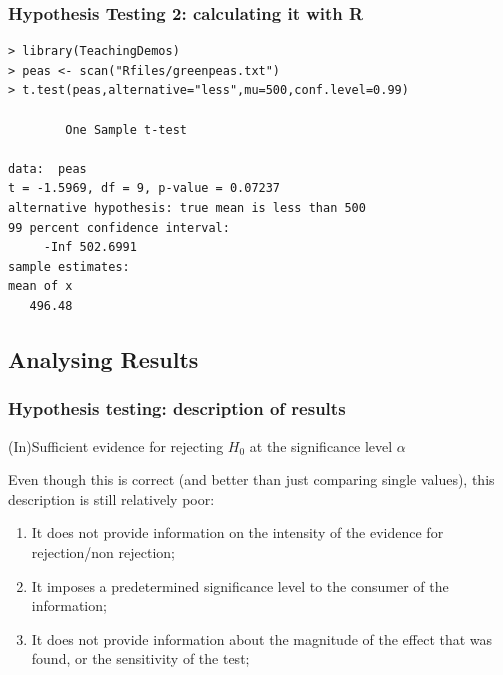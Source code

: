 \documentclass[10pt]{beamer}
\begin{document}
\begin{frame}
  \frametitle{Hypothesis Testing 2: calculating it with R}
  {\small
\begin{verbatim}
> library(TeachingDemos)
> peas <- scan("Rfiles/greenpeas.txt")
> t.test(peas,alternative="less",mu=500,conf.level=0.99)

        One Sample t-test

data:  peas
t = -1.5969, df = 9, p-value = 0.07237
alternative hypothesis: true mean is less than 500
99 percent confidence interval:
     -Inf 502.6991
sample estimates:
mean of x 
   496.48
\end{verbatim}
  }
\end{frame}

\subsection{Analysing Results}
\begin{frame}
  \frametitle{Hypothesis testing: description of results}
  \begin{block}{}
    (In)Sufficient evidence for rejecting $H_0$ at the significance
    level $\alpha$
  \end{block}

  \bigskip

  Even though this is correct (and better than just comparing single
  values), this description is still relatively poor:

  \medskip

  \begin{enumerate}
  \item It does not provide information on the intensity of the
    evidence for rejection/non rejection;
  \item It imposes a predetermined significance level to the consumer
    of the information;
  \item It does not provide information about the magnitude of the
    effect that was found, or the sensitivity of the test;
  \end{enumerate}
\end{frame}
\end{document}
